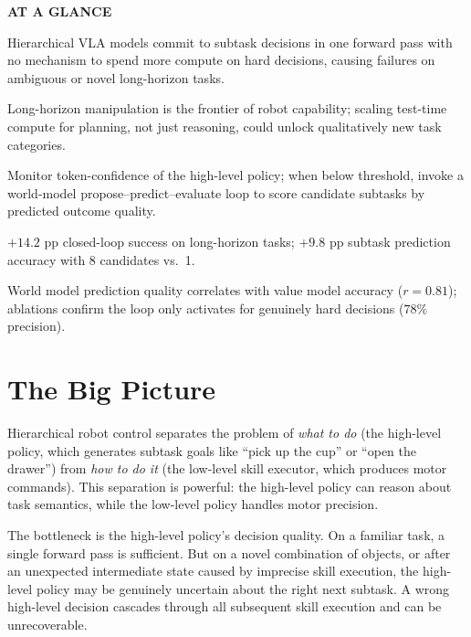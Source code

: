 \documentclass[10pt,twocolumn]{article}
\begin{document}
\begin{mdframed}[backgroundcolor=boxgray,linecolor=rulered,linewidth=1pt,
    innerleftmargin=6pt,innerrightmargin=6pt,
    innertopmargin=6pt,innerbottommargin=6pt]
\textbf{\small AT A GLANCE}\par\vspace{4pt}
\begin{description}[leftmargin=0pt,labelsep=4pt,itemsep=2pt,parsep=0pt,
    font=\small\bfseries]
  \item[Problem:] Hierarchical VLA models commit to subtask decisions in
    one forward pass with no mechanism to spend more compute on hard
    decisions, causing failures on ambiguous or novel long-horizon tasks.
  \item[Why it matters:] Long-horizon manipulation is the frontier of
    robot capability; scaling test-time compute for planning, not just
    reasoning, could unlock qualitatively new task categories.
  \item[Method:] Monitor token-confidence of the high-level policy;
    when below threshold, invoke a world-model propose--predict--evaluate
    loop to score candidate subtasks by predicted outcome quality.
  \item[Result:] $+14.2$ pp closed-loop success on long-horizon tasks;
    $+9.8$ pp subtask prediction accuracy with 8 candidates vs.\ 1.
  \item[Evidence:] World model prediction quality correlates with value
    model accuracy ($r = 0.81$); ablations confirm the loop only
    activates for genuinely hard decisions ($78\%$ precision).
\end{description}
\end{mdframed}

\section{The Big Picture}

Hierarchical robot control separates the problem of \emph{what to do}
(the high-level policy, which generates subtask goals like
``pick up the cup'' or ``open the drawer'') from \emph{how to do it}
(the low-level skill executor, which produces motor commands).
This separation is powerful: the high-level policy can reason about
task semantics, while the low-level policy handles motor precision.

The bottleneck is the high-level policy's decision quality. On a
familiar task, a single forward pass is sufficient. But on a novel
combination of objects, or after an unexpected intermediate state caused
by imprecise skill execution, the high-level policy may be genuinely
uncertain about the right next subtask. A wrong high-level decision
cascades through all subsequent skill execution and can be unrecoverable.
\end{document}
